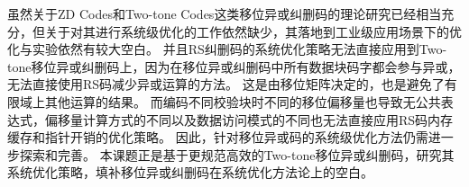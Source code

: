虽然关于ZD Codes和Two-tone Codes这类移位异或纠删码的理论研究已经相当充分，但关于对其进行系统级优化的工作依然缺少，其落地到工业级应用场景下的优化与实验依然有较大空白。
并且RS纠删码的系统优化策略无法直接应用到Two-tone移位异或纠删码上，因为在移位异或纠删码中所有数据块码字都会参与异或，无法直接使用RS码减少异或运算的方法。
这是由移位矩阵决定的，也是避免了有限域上其他运算的结果。
而编码不同校验块时不同的移位偏移量也导致无公共表达式，偏移量计算方式的不同以及数据访问模式的不同也无法直接应用RS码内存缓存和指针开销的优化策略。
因此，针对移位异或码的系统级优化方法仍需进一步探索和完善。
本课题正是基于更规范高效的Two-tone移位异或纠删码，研究其系统优化策略，填补移位异或纠删码在系统优化方法论上的空白。